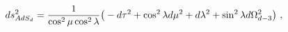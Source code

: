 \begin{equation}
ds^2_{AdS_d} = {1\over \cos^2\mu\cos^2\lambda} 
 \big( -d\tau^2 + \cos^2\lambda d\mu^2 + 
  d\lambda^2 +\sin^2\lambda d\Omega_{d-3}^2\big)\ ,
\label{adssix}
\end{equation}

